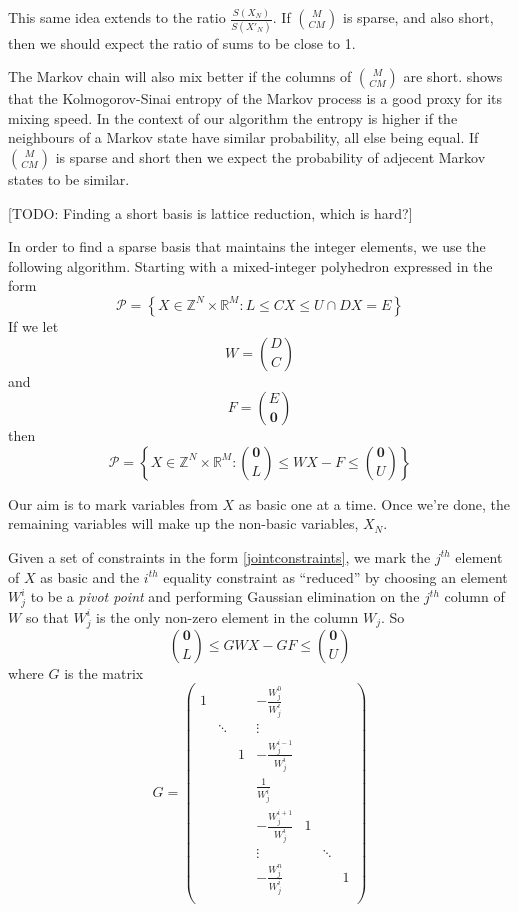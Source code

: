 \documentclass{article}
\begin{document}
This same idea extends to the ratio $\frac{S(X_N)}{S(X'_N)}$. If ${M \choose CM}$ is sparse, and also short, then we should expect the ratio of sums to be close to 1.

The Markov chain will also mix better if the columns of ${M \choose CM}$ are short. \citet{mihelich2018maximum} shows that the Kolmogorov-Sinai entropy of the Markov process is a good proxy for its mixing speed. In the context of our algorithm the entropy is higher if the neighbours of a Markov state have similar probability, all else being equal. If ${M \choose CM}$ is sparse and short then we expect the probability of adjecent Markov states to be similar.

[TODO: Finding a short basis is lattice reduction, which is hard?]

In order to find a sparse basis that maintains the integer elements, we use the following algorithm. Starting with a mixed-integer polyhedron expressed in the form
\[
\mathcal{P} = \left\{X \in \mathbb{Z}^N \times \mathbb{R}^M: L \le CX \le U \cap DX = E \right\}
\]
If we let
\[
W= {D \choose C}
\]
and
\[
F = {E \choose \mathbf{0}}
\]
then
\begin{equation}
\mathcal{P} = \left\{X \in \mathbb{Z}^N \times \mathbb{R}^M: {\mathbf{0} \choose L} \le W X - F \le {\mathbf{0} \choose U} \right\}
\label{jointconstraints}
\end{equation}

Our aim is to mark variables from $X$ as basic one at a time. Once we're done, the remaining variables will make up the non-basic variables, $X_N$.

Given a set of constraints in the form \eqref{jointconstraints}, we mark the $j^{th}$ element of $X$ as basic and the $i^{th}$ equality constraint as ``reduced'' by choosing an element $W^i_j$ to be a \textit{pivot point} and performing Gaussian elimination on the $j^{th}$ column of $W$ so that $W^i_j$ is the only non-zero element in the column $W_j$. So
\[
{\mathbf{0} \choose L} \le GWX - GF \le {\mathbf{0} \choose U}
\]
where $G$ is the matrix
\[
G =  
\begin{pmatrix}
1 &  & &-\frac{W^0_j}{W^i_j} & & &\\
& \ddots & &\vdots & & &\\
& & 1 & -\frac{W^{i-1}_j}{W^i_j} & & &\\
& & & \frac{1}{W^i_j} & & &\\
& &  & -\frac{W^{i+1}_j}{W^i_j} & 1 & &\\
& & & \vdots & & \ddots &\\
& & & -\frac{W^n_j}{W^i_j} & & &1\\
\end{pmatrix}
\]
\end{document}
